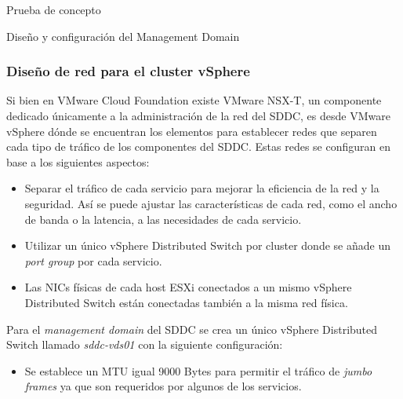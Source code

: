\begin{section}{Prueba de concepto}
\begin{subsection}{Diseño y configuración del Management Domain}
    \subsubsection{Diseño de red para el cluster vSphere}
    Si bien en VMware Cloud Foundation existe VMware NSX-T, un componente dedicado únicamente a la administración de la red del SDDC, es desde VMware vSphere dónde se encuentran los elementos para establecer redes que separen cada tipo de tráfico de los componentes del SDDC. Estas redes se configuran en base a los siguientes aspectos:
    \begin{itemize}
        \item Separar el tráfico de cada servicio para mejorar la eficiencia de la red y la seguridad. Así se puede ajustar las características de cada red, como el ancho de banda o la latencia, a las necesidades de cada servicio.
        \item Utilizar un único vSphere Distributed Switch por cluster donde se añade un \textit{port group} por cada servicio.
        \item Las NICs físicas de cada host ESXi conectados a un mismo vSphere Distributed Switch están conectadas también a la misma red física.
    \end{itemize}
    Para el \textit{management domain} del SDDC se crea un único vSphere Distributed Switch llamado \textit{sddc-vds01} con la siguiente configuración:
    \begin{itemize}
        
        \item Se establece un MTU igual 9000 Bytes para permitir el tráfico de \textit{jumbo frames} ya que son requeridos por algunos de los servicios.
        

\end{itemize}
\end{subsection}
\end{section}
